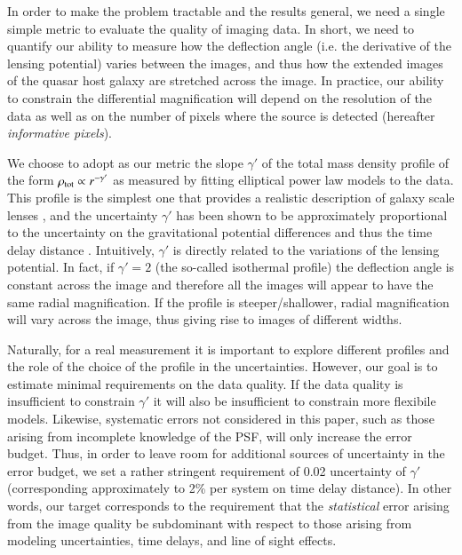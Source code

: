 \documentclass[a4paper,11pt]{article}
\begin{document}
In order to make the problem tractable and the results general, we
need a single simple metric to evaluate the quality of imaging
data. In short, we need to quantify our ability to measure how the
deflection angle (i.e. the derivative of the lensing potential) varies
between the images, and thus how the extended images of the quasar
host galaxy are stretched across the image. In practice, our ability
to constrain the differential magnification will depend on the
resolution of the data as well as on the number of pixels where the
source is detected (hereafter {\it informative pixels}).

We choose to adopt as our metric the slope $\gamma'$ of the total mass
density profile of the form $\rho_{\rm tot}\propto r^{-\gamma'}$ as
measured by fitting elliptical power law models to the data. This
profile is the simplest one that provides a realistic description of
galaxy scale lenses \citep{Treu2010}, and the uncertainty $\gamma'$
has been shown to be approximately proportional to the uncertainty on
the gravitational potential differences and thus the time delay
distance
\citep{2002ApJ...578...25K,2002MNRAS.332..951W,2012MNRAS.426..868S}. 
Intuitively, $\gamma'$ is directly related to the variations of the
lensing potential. In fact, if $\gamma'=2$ (the so-called isothermal
profile) the deflection angle is constant across the image and
therefore all the images will appear to have the same radial
magnification. If the profile is steeper/shallower, radial
magnification will vary across the image, thus giving rise to images
of different widths.

Naturally, for a real measurement it is important to explore different
profiles and the role of the choice of the profile in the
uncertainties. However, our goal is to estimate minimal requirements
on the data quality. If the data quality is insufficient to constrain
$\gamma'$ it will also be insufficient to constrain more flexibile
models. Likewise, systematic errors not considered in this paper, such
as those arising from incomplete knowledge of the PSF, will only
increase the error budget. Thus, in order to leave room for additional
sources of uncertainty in the error budget, we set a rather stringent
requirement of 0.02 uncertainty of $\gamma'$ (corresponding
approximately to 2\% per system on time delay distance). In other
words, our target corresponds to the requirement that the {\it
statistical} error arising from the image quality be subdominant with
respect to those arising from modeling uncertainties, time delays, and
line of sight effects.
\end{document}
